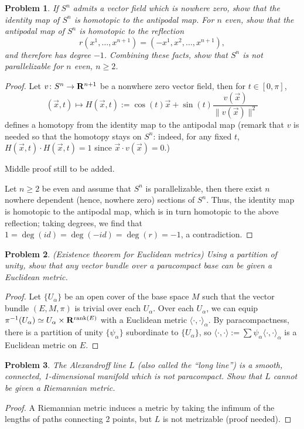 \documentclass[12pt,letterpaper]{article}
\newtheorem{problem}{Problem}[section]
\numberwithin{equation}{section}
\newcommand{\RR}{\ensuremath \mathbf{R}}
\begin{document}
\begin{problem}
If $S^n$ admits a vector field which is nowhere zero, show that the identity map of $S^n$ is homotopic to the antipodal map. For $n$ even, show that the antipodal map of $S^n$ is homotopic to the reflection 
\[
r(x^1,\ldots,x^{n+1}) = (-x^1,x^2,\ldots,x^{n+1}),
\]
and therefore has degree $-1$. Combining these facts, show that $S^n$ is not parallelizable for $n$ even, $n \geq 2$.
\end{problem}

\begin{proof}
Let $v \colon S^n \to \RR^{n+1}$ be a nonwhere zero vector field, then for $t \in [0,\pi]$,
\[
(\vec{x},t) \mapsto H(\vec{x},t) := \cos(t) \vec{x} + \sin(t) \frac{v(\vec{x})}{\| v(\vec{x}) \|^2 }
\]
defines a homotopy from the identity map to the antipodal map (remark that $v$ is needed so that the homotopy stays on $S^n$: indeed, for any fixed $t$, $H(\vec{x},t) \cdot H(\vec{x},t) = 1$ since $\vec{x} \cdot v(\vec{x}) = 0$.)

Middle proof still to be added.

Let $n \geq 2$ be even and assume that $S^n$ is parallelizable, then there exist $n$ nowhere dependent (hence, nowhere zero) sections of $S^n$. Thus, the identity map is homotopic to the antipodal map, which is in turn homotopic to the above reflection; taking degrees, we find that $1= \deg(id) = \deg(-id) = \deg(r) = -1$, a contradiction.
\end{proof}

\begin{problem}
(Existence theorem for Euclidean metrics) Using a partition of unity, show that any vector bundle over a paracompact base can be given a Euclidean metric. 
\end{problem}

\begin{proof}
Let $\{ U_{\alpha} \}$ be an open cover of the base space $M$ such that the vector bundle $(E,M,\pi)$ is trivial over each $U_{\alpha}$. Over each $U_{\alpha}$, we can equip $\pi^{-1}(U_{\alpha}) \simeq U_{\alpha} \times \RR^{\textrm{rank}(E)}$ with a Euclidean metric $\langle \cdot, \cdot \rangle_{\alpha}$. By paracompactness, there is a partition of unity $\{ \psi_{\alpha} \}$ subordinate to $\{ U_{\alpha} \}$, so $\langle \cdot , \cdot \rangle := \sum \psi_{\alpha} \langle \cdot , \cdot \rangle_{\alpha}$ is a Euclidean metric on $E$.
\end{proof}

\begin{problem}
The Alexandroff line $L$ (also called the ``long line'') is a smooth, connected, 1-dimensional manifold which is not paracompact. Show that $L$ cannot be given a Riemannian metric.
\end{problem}

\begin{proof}
A Riemannian metric induces a metric by taking the infimum of the lengths of paths connecting 2 points, but $L$ is not metrizable (proof needed).
\end{proof}
\end{document}
